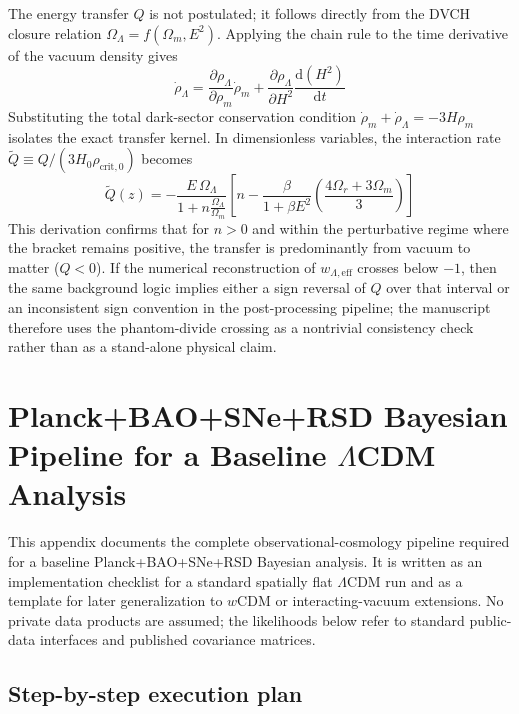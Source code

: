 \documentclass[pdflatex,sn-mathphys-num]{sn-jnl}%
\newcommand{\Ecrit}{\rho_{\mathrm{crit},0}}
\begin{document}
The energy transfer $Q$ is not postulated; it follows directly from the DVCH
closure relation $\Omega_\Lambda = f(\Omega_m, E^2)$. Applying the chain rule
to the time derivative of the vacuum density gives
\begin{equation}
    \dot{\rho}_\Lambda = \frac{\partial \rho_\Lambda}{\partial \rho_m} \dot{\rho}_m + \frac{\partial \rho_\Lambda}{\partial H^2} \frac{\mathrm{d}(H^2)}{\mathrm{d}t}
\end{equation}
Substituting the total dark-sector conservation condition
$\dot{\rho}_m + \dot{\rho}_\Lambda = -3H\rho_m$ isolates the exact transfer
kernel. In dimensionless variables, the interaction rate
$\tilde{Q} \equiv Q/(3H_0\Ecrit)$ becomes
\begin{equation}
    \tilde{Q}(z) = -\frac{E\,\Omega_\Lambda}{1 + n\frac{\Omega_\Lambda}{\Omega_m}} \left[ n - \frac{\beta}{1+\beta E^2} \left( \frac{4\Omega_r + 3\Omega_m}{3} \right) \right]
\end{equation}
This derivation confirms that for $n>0$ and within the perturbative regime
where the bracket remains positive, the transfer is predominantly from vacuum
to matter ($Q<0$). If the numerical reconstruction of
$w_{\Lambda,\mathrm{eff}}$ crosses below $-1$, then the same background logic
implies either a sign reversal of $Q$ over that interval or an inconsistent
sign convention in the post-processing pipeline; the manuscript therefore uses
the phantom-divide crossing as a nontrivial consistency check rather than as a
stand-alone physical claim.


\section{Planck+BAO+SNe+RSD Bayesian Pipeline for a Baseline \texorpdfstring{$\Lambda$}{Lambda}CDM Analysis}
\label{app:planck_bao_sne_rsd_pipeline}

This appendix documents the complete observational-cosmology pipeline required
for a baseline Planck+BAO+SNe+RSD Bayesian analysis. It is written as an
implementation checklist for a standard spatially flat $\Lambda$CDM run and as
a template for later generalization to $w$CDM or interacting-vacuum extensions.
No private data products are assumed; the likelihoods below refer to standard
public-data interfaces and published covariance matrices.

\subsection{Step-by-step execution plan}
\label{subsec:pipeline_steps}
\end{document}
